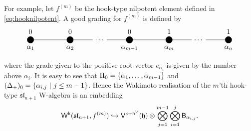 \documentclass[10pt,a4paper]{amsart}
\numberwithin{equation}{section}
\newcommand{\kk}{\mathsf{k}}   %
\DeclarePairedDelimiter{\brac}{\lparen}{\rparen}   %
\DeclarePairedDelimiter{\set}{\lbrace}{\rbrace}
\newcommand{\alg}[1]{\mathfrak{#1}}  %
\newcommand{\VOA}[1]{\mathsf{#1}}    %
\newcommand{\SLA}[2]{\alg{#1}_{#2}}                      %
\newcommand{\slnpone}{\SLA{sl}{n+1}}
\newcommand{\cartan}{\mathfrak{h}}
\newcommand{\cox}{\mathsf{h}}                                        %
\newcommand{\dcox}{\coroot{\cox}}                                    %
\newcommand{\proots}{\Delta_+}                                       %
\newcommand{\sroots}{\Pi}                                            %
\newcommand{\sroot}[1]{\alpha_{#1}}                                  %
\newcommand{\prvec}[1]{e_{#1}}                                        %
\newcommand{\coroot}[1]{#1^{\vee}}                                   %
\newcommand{\fhook}[1]{f^{(#1)}}                                  %
\newcommand{\Wsymb}{\VOA{W}}
\newcommand{\uaffvoa}[2]{\VOA{V}^{#1}\brac{#2}}                   %
\newcommand{\bgvoa}{\VOA{B}}                                      %
\newcommand{\uQHR}[3]{\Wsymb^{#1}\brac{#2,#3}}                    %
\theoremstyle{plain}
\begin{document}
For example, let $\fhook{m}$ be the hook-type nilpotent element defined in \eqref{eq:hooknilpotent}. A good grading for $\fhook{m}$ is defined by
%
\begin{equation} \label{eq:GoodGrading}
\begin{tikzpicture}
    \node[circle,draw,fill=black,label=below:$\sroot{1}$,label=above:$0$] (1) at (0,0) {};
    \node[circle,draw,fill=black,label=below:$\sroot{2}$,label=above:$0$] (2) at (2,0) {};
    \node (A) at (3.5,0) {\dots};
    \node[circle,draw,fill=black,label=below:$\sroot{m-1}$,label=above:$0$] (m-1) at (5,0) {};
    \node[circle,draw,fill=black,label=below:$\sroot{m}$,label=above:$1$] (m) at (7,0) {};
    \node (B) at (8.5,0) {\dots};
    \node[circle,draw,fill=black,label=below:$\sroot{n}$,label=above:$1$] (n) at (10,0) {};

    \draw (1)--(2);
    \draw (2)--(A);
    \draw (A)--(m-1);
    \draw (m-1)--(m);
    \draw (m)--(B);
    \draw (B)--(n);
\end{tikzpicture} 
\end{equation}
%
where the grade given to the positive root vector $\prvec{\sroot{i}}$ is given by the number above $\sroot{i}$. It is easy to see that $\sroots_0 = \set{\sroot{1}, \dots, \sroot{m-1}}$ and $(\proots)_0 = \set{\sroot{i,j} \ \vert \ j \leq m-1}$. Hence the Wakimoto realisation of the $m$'th hook-type $\slnpone$ W-algebra is an embedding
%
\begin{equation} \label{eq:WakEmbHook}
    \uQHR{\kk}{\slnpone}{\fhook{m}} \hookrightarrow \uaffvoa{\kk+\dcox}{\cartan} \otimes \bigotimes_{j=1}^{m-1}\bigotimes_{i=1}^{j} \bgvoa_{\sroot{i,j}}.
\end{equation}
\end{document}
